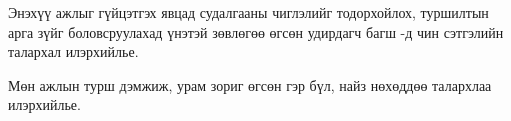 
\begin{acknowledgements}
\addchaptertocentry{\acknowledgementname}

Энэхүү ажлыг гүйцэтгэх явцад судалгааны чиглэлийг тодорхойлох, туршилтын арга зүйг боловсруулахад үнэтэй
зөвлөгөө өгсөн удирдагч багш \supname-д чин сэтгэлийн талархал илэрхийлье. %

Мөн ажлын турш дэмжиж, урам зориг өгсөн гэр бүл, найз нөхөддөө талархлаа илэрхийлье.

\end{acknowledgements}
